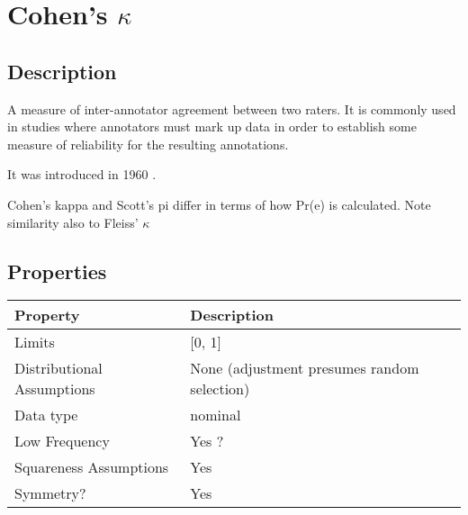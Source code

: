 \documentclass[11pt]{article}
\begin{document}
\section{Cohen's $\kappa$} %
\subsection{Description}
A measure of inter-annotator agreement between two raters.  It is commonly used in studies where annotators must mark up data in order to establish some measure of reliability for the resulting annotations.

It was introduced in 1960 \cite{cohen1960coefficient}.

Cohen's kappa and Scott's pi differ in terms of how Pr(e) is calculated.  Note similarity also to Fleiss' $\kappa$ %


\subsection{Properties}
\begin{tabular}{| l || l |}
    \hline
    {\bf Property} & {\bf Description} \\
    \hline
    Limits & [0, 1] \\ \hline

    Distributional Assumptions & None (adjustment presumes random selection) \\ \hline

    Data type & nominal \\ \hline

    Low Frequency & Yes {\color{red}?} \\ \hline

    Squareness Assumptions & Yes \\ \hline
    
    Symmetry? & Yes \\ \hline

\end{tabular}
\end{document}
